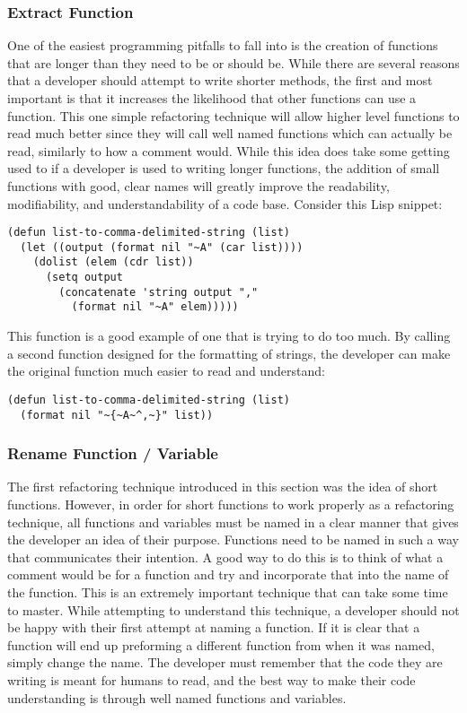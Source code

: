 \documentclass{article}
\begin{document}
\subsubsection{Extract Function}

One of the easiest programming pitfalls to fall into is the creation of functions that are longer than they need to be or should be. While there are several reasons that a developer should attempt to write shorter methods, the first and most important is that it increases the likelihood that other functions can use a function. This one simple refactoring technique will allow higher level functions to read much better since they will call well named functions which can actually be read, similarly to how a comment would. While this idea does take some getting used to if a developer is used to writing longer functions, the addition of small functions with good, clear names will greatly improve the readability, modifiability, and understandability of a code base. Consider this Lisp snippet:

\begin{verbatim}
(defun list-to-comma-delimited-string (list)
  (let ((output (format nil "~A" (car list))))
    (dolist (elem (cdr list))
      (setq output 
        (concatenate 'string output "," 
          (format nil "~A" elem)))))
\end{verbatim}

This function is a good example of one that is trying to do too much. By calling a second function designed for the formatting of strings, the developer can make the original function much easier to read and understand:

\begin{verbatim}
(defun list-to-comma-delimited-string (list)
  (format nil "~{~A~^,~}" list))
\end{verbatim}

\subsubsection{Rename Function / Variable}

The first refactoring technique introduced in this section was the idea of short functions. However, in order for short functions to work properly as a refactoring technique, all functions and variables must be named in a clear manner that gives the developer an idea of their purpose. Functions need to be named in such a way that communicates their intention. A good way to do this is to think of what a comment would be for a function and try and incorporate that into the name of the function. This is an extremely important technique that can take some time to master. While attempting to understand this technique, a developer should not be happy with their first attempt at naming a function. If it is clear that a function will end up preforming a different function from when it was named, simply change the name. The developer must remember that the code they are writing is meant for humans to read, and the best way to make their code understanding is through well named functions and variables. 
\end{document}
